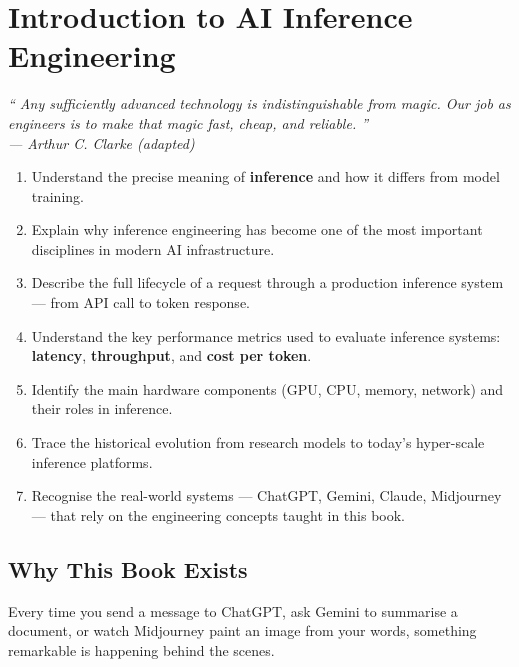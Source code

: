 \documentclass[12pt, twoside, openright]{book}
\newcommand{\chapquote}[2]{%
  \begin{center}
    \begin{minipage}{0.82\textwidth}
      \itshape\large ``#1''
      \vspace{4pt}\\
      \normalsize\normalfont\hfill --- #2
    \end{minipage}
  \end{center}
  \vspace{8pt}
}
\newenvironment{learningobjectives}{%
  \begin{tcolorbox}[
    enhanced, breakable,
    colback=chaptercolor!6, colframe=chaptercolor,
    title={\bfseries\color{white} Learning Objectives},
    fonttitle=\bfseries,
    coltitle=white,
    colbacktitle=chaptercolor,
    arc=4pt,
    left=8pt, right=8pt, top=6pt, bottom=6pt,
  ]
  \begin{enumerate}[label=\textcolor{chaptercolor}{\bfseries\arabic*.}, leftmargin=*]
}{%
  \end{enumerate}
  \end{tcolorbox}
}
\begin{document}
\chapter{Introduction to AI Inference Engineering}

\chapquote{%
  Any sufficiently advanced technology is indistinguishable from magic.
  Our job as engineers is to make that magic fast, cheap, and reliable.%
}{Arthur C. Clarke (adapted)}

\vspace{0.5cm}

\begin{learningobjectives}
  \item Understand the precise meaning of \textbf{inference} and how it
        differs from model training.
  \item Explain why inference engineering has become one of the most
        important disciplines in modern AI infrastructure.
  \item Describe the full lifecycle of a request through a production
        inference system --- from API call to token response.
  \item Understand the key performance metrics used to evaluate inference
        systems: \textbf{latency}, \textbf{throughput}, and
        \textbf{cost per token}.
  \item Identify the main hardware components (GPU, CPU, memory, network)
        and their roles in inference.
  \item Trace the historical evolution from research models to today's
        hyper-scale inference platforms.
  \item Recognise the real-world systems --- ChatGPT, Gemini, Claude,
        Midjourney --- that rely on the engineering concepts taught in
        this book.
\end{learningobjectives}

\section{Why This Book Exists}

Every time you send a message to ChatGPT, ask Gemini to summarise a
document, or watch Midjourney paint an image from your words, something
remarkable is happening behind the scenes.
\end{document}
